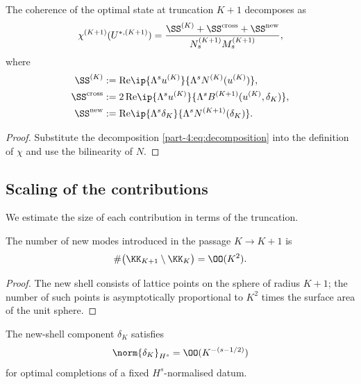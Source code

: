 \begin{proposition}\label{part-4:prop:three-cont}
The coherence of the optimal state at truncation $K+1$ decomposes as
\begin{equation}\label{part-4:eq:chi-decomp}
\chi^{(K+1)}(U^{\ast,(K+1)}) 
= \frac{\SS^{(K)} + \SS^{\mathrm{cross}} + \SS^{\mathrm{new}}}
       {N_s^{(K+1)} M_s^{(K+1)}},
\end{equation}
where
\begin{align}
\SS^{(K)} &:= \mathrm{Re}\ip{\Lambda^s u^{(K)}}{\Lambda^s N^{(K)}(u^{(K)})},\label{part-4:eq:S-K}\\
\SS^{\mathrm{cross}} &:= 2\,\mathrm{Re}\ip{\Lambda^s u^{(K)}}{\Lambda^s B^{(K+1)}(u^{(K)},\delta_K)},\label{part-4:eq:S-cross}\\
\SS^{\mathrm{new}} &:= \mathrm{Re}\ip{\Lambda^s\delta_K}{\Lambda^s N^{(K+1)}(\delta_K)}.\label{part-4:eq:S-new}
\end{align}
\end{proposition}

\begin{proof}
Substitute the decomposition \eqref{part-4:eq:decomposition} into the 
definition of $\chi$ and use the bilinearity of $N$.
\end{proof}

\subsection{Scaling of the contributions}
\label{part-4:ssec:scaling}

We estimate the size of each contribution in terms of the truncation.

\begin{proposition}\label{part-4:prop:dim-shell}
The number of new modes introduced in the passage $K\to K+1$ is
\begin{equation}\label{part-4:eq:num-new}
\#\bigl(\KK_{K+1}\setminus\KK_K\bigr) = 
\OO(K^2).
\end{equation}
\end{proposition}

\begin{proof}
The new shell consists of lattice points on the sphere of radius 
$K+1$; the number of such points is asymptotically proportional to 
$K^2$ times the surface area of the unit sphere.
\end{proof}

\begin{proposition}\label{part-4:prop:scaling-delta}
The new-shell component $\delta_K$ satisfies
\begin{equation}\label{part-4:eq:delta-scaling}
\norm{\delta_K}_{H^s} = \OO(K^{-(s-1/2)})
\end{equation}
for optimal completions of a fixed $H^s$-normalised datum.
\end{proposition}

